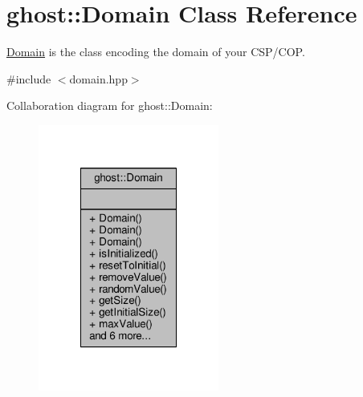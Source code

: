 \hypertarget{classghost_1_1Domain}{\section{ghost\-:\-:Domain Class Reference}
\label{classghost_1_1Domain}
}


\hyperlink{classghost_1_1Domain}{Domain} is the class encoding the domain of your C\-S\-P/\-C\-O\-P.  




{\ttfamily \#include $<$domain.\-hpp$>$}



Collaboration diagram for ghost\-:\-:Domain\-:
\nopagebreak
\begin{figure}[H]
\begin{center}
\leavevmode
\includegraphics[width=168pt]{classghost_1_1Domain__coll__graph}
\end{center}
\end{figure}
